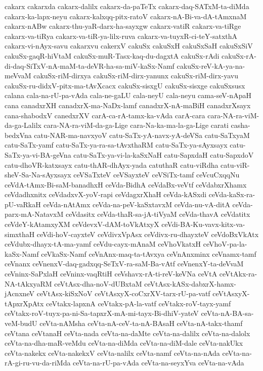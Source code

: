 {cakarx
cakarxda
cakarx-dalilx
cakarx-da-paTeTx
cakarx-daq-SATxM-ta-diMda
cakarx-ka-lapx-neyu
cakarx-kalxqq-pitx-ratoV
cakarx-nA-Bi-va-dA-tAmxnaM
cakarx-nABw
cakarx-thu-yaR-darx-ha-sayxgw
cakarx-vatiR
cakarx-va-tiRge
cakarx-va-tiRya
cakarx-va-tiR-ya-lilx-ruva
cakarx-va-tuyxR-ci-teY-satxthA
cakarx-vi-nAyx-savu
cakarxvu
cakerxV
cakuSx
cakuSxH
cakuSxSaH
cakuSxSiV
cakuSx-gaqR-hiVtaM
cakuSx-muR-Tasx-kaq-du-dagxtA
cakuSx-rAdi
cakuSx-rA-di-daq-SiTxV-nA-maM-ta-deVR-ha-sa-miV-kaSx-Namf
cakuSx-reV-kA-ya-na-meVvaM
cakuSx-riM-dirxya
cakuSx-riM-dirx-yanunx
cakuSx-riM-dirx-yavu
cakuSx-ru-didxV-pitx-ma-tAvXcacx
cakuSx-sisxgU
cakuSx-sisxge
cakuSxsusx
calana
cala-na-rU-pa-vAda
cala-ne-gaLU
cala-neyU
cala-neyu
cama-seV-nApaH
cana
canadxrXH
canadxrX-ma-NaDx-lamf
canadxrX-nA-maBiH
canadxrXsayx
cana-shabodxV
canedxrXV
carA-ca-rA-tamx-ka-vAda
carA-cara
cara-NA-ra-viM-da-ga-Lalilx
cara-NA-ra-viM-da-ga-Lige
cara-Na-ka-ma-la-ga-Lige
carati
casha-bedxVna
catu-NAR-ma-navxyoV
catu-SaTx-yA-navx-yA-deVSa
catu-SaTxyaM
catu-SaTx-yamf
catu-SaTx-ya-ra-sa-tAvxthaRM
catu-SaTx-ya-sAyxsayx
catu-SaTx-ya-vi-BA-geVna
catu-SaTx-ya-vi-la-kaSxNaH
catu-SapxdaH
catu-SapxdoV
catu-dhoVR-katxsayx
catu-thAR-dhAyx-yada
catuthaR
catu-viRdha
catu-viR-sheV-Sa-Na-sAyxsayx
ceVSaTxteV
ceVSayxteV
ceVSiTx-tamf
ceVcuCxqqNu
ceVdA-tAmx-Bi-saM-banadhxH
ceVda-BidhA
ceVdaBx-veVtf
ceVdabxrXhamx
ceVdadhxnitx
ceVdadxvX-yoV-rapi
ceVdagxrXhaH
ceVda-kASxdi
ceVda-kaSx-ra-pU-vaRkaH
ceVda-nAtAmx
ceVda-na-peV-kaSxtavxM
ceVda-nu-vA-ditA
ceVda-parx-mA-NatavxM
ceVdasitx
ceVda-thaR-sa-jA-tiVyaM
ceVda-thavA
ceVdatitx
ceVdeY-kAtamxyXM
ceVdevxV-dAM-toVkAtxyX
ceVdi-BA-Ku-vavx-kitx-va-simxthaH
ceVdi-hoV-cayxteV
ceVdivxVpAsx
ceVdivx-ru-dhayxteV
ceVdoBxVkAtx
ceVdubx-dhayx-tA-ma-yamf
ceVdu-cayx-mAnaM
ceVhoVkatxH
ceVhoV-pa-la-kaSx-Namf
ceVkaSx-Namf
ceVnAnx-maq-ta-tAvxya
ceVnAnxminx
ceVnamx-tamf
ceVnanx
ceVnenxV-daq-gadxqq-SeTxV-ra-saM-Ba-vAtf
ceVnenxY-ta-deVvaM
ceVninx-SaPxlaH
ceVninx-vaqRtiH
ceVshavx-rA-ti-reV-keVNa
ceVtA
ceVtAkx-ra-NA-tAkxyaRM
ceVtAsx-dha-noV-dUBxtaM
ceVtAsx-kASx-dabxrX-hamx-jAcnxneV
ceVtAsx-kiSxNoV
ceVtAsxyX-coCxrXV-tarx-rU-pa-vatf
ceVtAsxyX-tApxrXpAtx
ceVtakx-lapxnA
ceVtakx-pA-la-vatf
ceVtakx-roV-tayx-yamf
ceVtakx-roV-tuyx-pa-ni-Sa-tapxrX-mA-mi-tayx-Bi-dhiV-yateV
ceVta-nA-BA-sa-veM-budU
ceVta-nAMsha
ceVta-nA-ceV-ta-nA-BAsaH
ceVta-nA-takx-thamf
ceVtana
ceVtanaH
ceVta-nada
ceVta-na-daMte
ceVta-na-dalilx
ceVta-na-dalolx
ceVta-na-dha-maR-veMdu
ceVta-na-diMda
ceVta-na-diM-dale
ceVta-nakUkx
ceVta-nakekx
ceVta-nakekxV
ceVta-nalilx
ceVta-namf
ceVta-na-nAda
ceVta-na-rA-gi-ru-vu-da-riMda
ceVta-na-rU-pa-vAda
ceVta-na-seyxYva
ceVta-na-vAda
}
